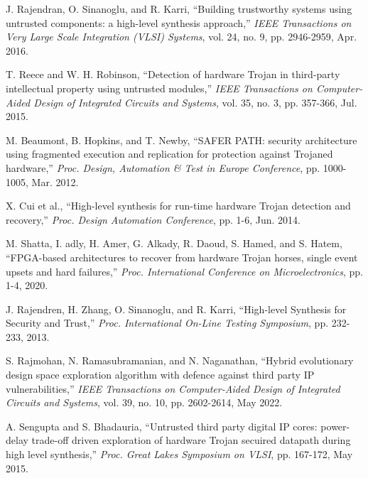 \documentclass[10pt,journal, compsoc]{IEEEtran}
\begin{document}
\begin{thebibliography}{99}
J. Rajendran, O. Sinanoglu, and R. Karri, ``Building trustworthy systems using untrusted components: a high-level synthesis approach,'' \textit{IEEE Transactions on Very Large Scale Integration (VLSI) Systems}, vol. 24, no. 9, pp. 2946-2959, Apr. 2016.


T. Reece and W. H. Robinson, ``Detection of hardware Trojan in third-party intellectual property using untrusted modules,'' \textit{IEEE Transactions on Computer-Aided Design of Integrated Circuits and Systems}, vol. 35, no. 3, pp. 357-366, Jul. 2015.

M. Beaumont, B. Hopkins, and T. Newby, ``SAFER PATH: security architecture using fragmented execution and replication for protection against Trojaned hardware,'' \textit{Proc. Design, Automation \& Test in Europe Conference}, pp. 1000-1005, Mar. 2012.

X. Cui et al., ``High-level synthesis for run-time hardware Trojan detection and recovery,'' \textit{Proc. Design Automation Conference}, pp. 1-6, Jun. 2014.

M. Shatta, I. adly, H. Amer, G. Alkady, R. Daoud, S. Hamed, and S. Hatem, ``FPGA-based architectures to recover from hardware Trojan horses, single event upsets and hard failures,'' \textit{Proc. International Conference on Microelectronics}, pp. 1-4, 2020.

J. Rajendren, H. Zhang, O. Sinanoglu, and R. Karri, ``High-level Synthesis for Security and Trust,'' \textit{Proc. International On-Line Testing Symposium}, pp. 232-233, 2013.

S. Rajmohan, N. Ramasubramanian, and N. Naganathan, ``Hybrid evolutionary design space exploration algorithm with defence against third party IP vulnerabilities,'' \textit{IEEE Transactions on Computer-Aided Design of Integrated Circuits and Systems}, vol. 39, no. 10, pp. 2602-2614, May 2022.

A. Sengupta and S. Bhadauria, ``Untrusted third party digital IP cores: power-delay trade-off driven exploration of hardware Trojan secuired datapath during high level synthesis,'' \textit{Proc. Great Lakes Symposium on VLSI}, pp. 167-172, May 2015.


\end{thebibliography}
\end{document}
